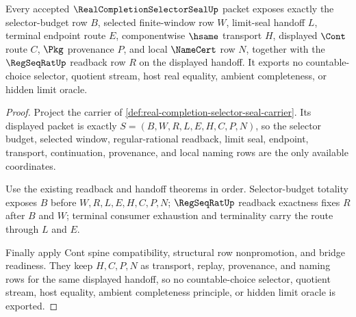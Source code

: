 \begin{theorem}
\label{thm:real-completion-selector-seal-obligation-scope}
Every accepted $\RealCompletionSelectorSealUp$ packet exposes exactly the selector-budget row $B$, selected finite-window row $W$, limit-seal handoff $L$, terminal endpoint route $E$, componentwise $\hsame$ transport $H$, displayed $\Cont$ route $C$, $\Pkg$ provenance $P$, and local $\NameCert$ row $N$, together with the $\RegSeqRatUp$ readback row $R$ on the displayed handoff. It exports no countable-choice selector, quotient stream, host real equality, ambient completeness, or hidden limit oracle.
\end{theorem}
\begin{proof}
Project the carrier of \autoref{def:real-completion-selector-seal-carrier}. Its displayed packet is exactly $S=(B,W,R,L,E,H,C,P,N)$, so the selector budget, selected window, regular-rational readback, limit seal, endpoint, transport, continuation, provenance, and local naming rows are the only available coordinates.

Use the existing readback and handoff theorems in order. Selector-budget totality exposes $B$ before $W,R,L,E,H,C,P,N$; $\RegSeqRatUp$ readback exactness fixes $R$ after $B$ and $W$; terminal consumer exhaustion and terminality carry the route through $L$ and $E$.

Finally apply Cont spine compatibility, structural row nonpromotion, and bridge readiness. They keep $H,C,P,N$ as transport, replay, provenance, and naming rows for the same displayed handoff, so no countable-choice selector, quotient stream, host equality, ambient completeness principle, or hidden limit oracle is exported.
\end{proof}

